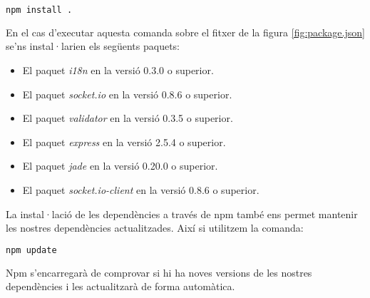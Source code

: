 \begin{lstlisting}[language=bash]
npm install . 
\end{lstlisting}

En el cas d'executar aquesta comanda sobre el fitxer de la figura \ref{fig:package.json} se'ns instal·larien els següents paquets: 

\begin{itemize}
  \item{El paquet \emph{i18n} en la versió 0.3.0 o superior.}
  \item{El paquet \emph{socket.io} en la versió 0.8.6 o superior.}
  \item{El paquet \emph{validator} en la versió 0.3.5  o superior.}
  \item{El paquet \emph{express} en la versió 2.5.4 o superior.}
  \item{El paquet \emph{jade} en la versió 0.20.0 o superior.}
  \item{El paquet \emph{socket.io-client} en la versió 0.8.6 o superior.}
\end{itemize}

La instal·lació de les dependències a través de npm també ens permet mantenir les nostres dependències actualitzades. Així si utilitzem la comanda: 

\begin{lstlisting}[language=bash]
npm update
\end{lstlisting}

Npm s'encarregarà de comprovar si hi ha noves versions de les nostres dependències i les actualitzarà de forma automàtica. 




